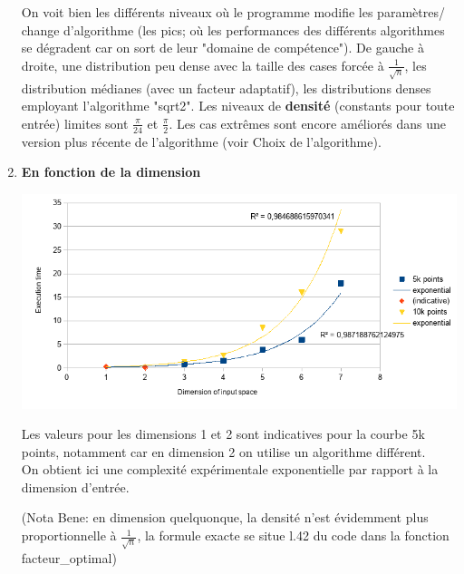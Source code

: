 \documentclass[a4paper,11pt]{article}
\begin{document}
\begin{enumerate}
On voit bien les différents niveaux où le programme modifie les paramètres/ change d'algorithme (les pics; où les performances des différents algorithmes se dégradent car on sort de leur "domaine de compétence").
De gauche à droite, une distribution peu dense avec la taille des cases forcée à $\frac{1}{\sqrt{n}}$, les distribution médianes (avec un facteur adaptatif), les distributions denses employant l'algorithme "sqrt2".
\smallbreak
Les niveaux de \textbf{densité} (constants pour toute entrée) limites sont $\frac{\pi}{24}$ et $\frac{\pi}{2}$.
\smallbreak
Les cas extrêmes sont encore améliorés dans une version plus récente de l'algorithme (voir Choix de l'algorithme).
 
\bigbreak
 \item \textbf{En fonction de la dimension}\\
\begin{center}\hspace{-6mm}
\includegraphics[scale=2.3]{perfs_dimension.png}
\end{center}
Les valeurs pour les dimensions 1 et 2 sont indicatives pour la courbe 5k points, notamment car en dimension 2 on utilise un algorithme différent.\\
On obtient ici une complexité expérimentale exponentielle par rapport à la dimension d'entrée.

(Nota Bene: en dimension quelquonque, la densité n'est évidemment plus proportionnelle à $\frac{1}{\sqrt{n}}$, la formule exacte se situe l.42 du code dans la fonction facteur\_optimal)



















\end{enumerate}
\end{document}
